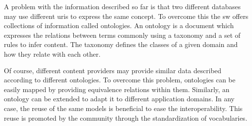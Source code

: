 \begin{savenotes}
\end{savenotes}


A problem with the information described so far is that two different databases may use different \acs{uri}s to express the same concept.
To overcome this the \ac{sw} offers collections of information called ontologies.
An ontology is a document which expresses the relations between terms commonly using a taxonomy and a set of rules to infer content.
The taxonomy defines the classes of a given domain and how they relate with each other.


Of course, different content providers may provide similar data described according to different ontologies.
To overcome this problem, ontologies can be easily mapped by providing equivalence relations within them.
Similarly, an ontology can be extended to adapt it to different application domains.
In any case, the reuse of the same models is beneficial to ease the interoperability.
This reuse is promoted by the community through the standardization of vocabularies.

